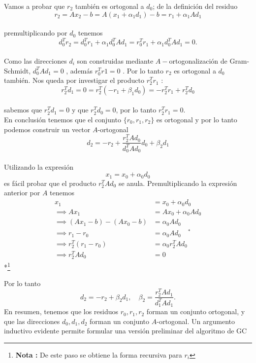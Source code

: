 \documentclass[12pt]{article}
\begin{document}
Vamos a probar que $r_2$ tambi\'en es ortogonal a $d_0$; de la definici\'on del residuo
\[
    r_2 = Ax_2 - b = A(x_1 + \alpha_1d_1) - b  = r_1 + \alpha_1 Ad_1
\]\\
premultiplicando por $d_0$ tenemos
\[
   d_0^Tr_2 = d_0^Tr_1 + \alpha_1 d_0^T Ad_1 = r_0^Tr_1 + \alpha_1 d_0^T Ad_1 = 0.
\]\\

Como las direcciones $d_i$ son construidas mediante $A-$ortogonalizaci\'on de Gram-Schmidt, $d_0^TAd_1 = 0$ , adem\'as $r_0^Tr1 = 0$ . Por lo tanto $r_2$ es ortogonal a $d_0$ tambi\'en.  Nos queda por investigar el producto $r_2^Tr_1$ :
\[
   r_2^Td_1 = 0 = r_2^T(- r_1 + \beta_1d_0) = - r_2^Tr_1 + r_2^Td_0 
\] \\
sabemos que $r_2^Td_1 = 0$ y que $r_2^T d_0 = 0$, por lo tanto $r_2^Tr_1 = 0$. \\

En conclusi\'on tenemos que el conjunto $\{r_0, r_1, r_2 \}$ es ortogonal y por lo tanto podemos construir un vector $A$-ortogonal
\[
   d_2 = - r_2 + \frac{r_2^TAd_0}{d_0^TAd_0} d_0 + \beta_2 d_1
\]\\ 

Utilizando la expresi\'on 
\[
   x_1 = x_0 + \alpha_0 d_0
\]
es f\'acil probar que el producto $r_2^TAd_0$ se anula. 
Premultiplicando la expresi\'on anterior por $A$ tenemos
\begin{align*}
    x_1 &= x_0 + \alpha_0 d_0 \\
    \implies A x_1 &=  Ax_0 + \alpha_0 A d_0 \\
\implies ( Ax_1 - b)- (Ax_0 - b) &=  \alpha_0 Ad_0 \\
\implies r_1 - r_0 &=  \alpha_0  Ad_0 \quad ^*\\
\implies r_2^T(r_1 - r_0) &= \alpha_0 r_2^T Ad_0 \\
\implies r_2^T Ad_0 &= 0 
\end{align*}
*\footnote{ {\bf Nota :} De este paso se obtiene la forma recursiva para $r_i$ }

Por lo tanto
\[
   d_2 = -r_2 + \beta_2 d_1, \quad  \beta_2 = \frac{r_2^TAd_1}{d_1^TAd_1}.
\]
En resumen, tenemos que los residuos $r_0,r_1,r_2$ forman un conjunto ortogonal, y que las direcciones $d_0, d_1, d_2$ forman un conjunto $A$-ortogonal. Un argumento inductivo evidente permite formular una versi\'on preliminar del algoritmo de GC

\end{document}

